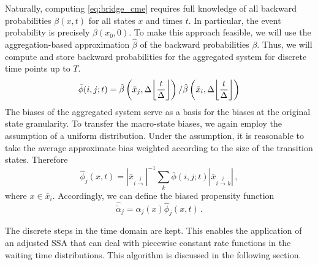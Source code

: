 Naturally, computing \eqref{eq:bridge_cme} requires full knowledge of all backward probabilities $\beta(x, t)$ for all states $x$ and times $t$.
In particular, the event probability is precisely $\beta(x_0, 0)$.
To make this approach feasible, we will use the aggregation-based approximation $\hat{\beta}$ of the backward probabilities $\beta$.
Thus, we will compute and store backward probabilities for the aggregated system for discrete time points up to $T$.
\[
    \bar{\phi}(i, j; t) = \hat{\beta}\left(\bar{x}_j, \Delta\floor*{\frac{t}{\Delta}}\right) / \hat{\beta}\left(\bar{x}_i, \Delta\floor*{\frac{t}{\Delta}}\right)
\]
The biases of the aggregated system serve as a basis for the biases at the original state granularity.
To transfer the macro-state biases, we again employ the assumption of a uniform distribution.
Under the assumption, it is reasonable to take the average approximate bias weighted according to the size of the transition states.
Therefore
\[
    \hat{\phi}_j(x, t)
    =
        {\left|\bar{x}_{i\xrightarrow{j}}\right|}^{-1}
        \sum_k
        \bar\phi(i, j; t)
        \left|\bar{x}_{i\xrightarrow{j}k}\right|\,,
\]
where $x\in\bar{x}_i$.
Accordingly, we can define the biased propensity function
\[
    \hat{\tilde{\alpha}}_j
    =
    \alpha_j(x)\hat{\phi}_j(x, t)\,.
\]

The discrete steps in the time domain are kept.
This enables the application of an adjusted \ac{SSA} that can deal with piecewise constant rate functions in the waiting time distributions.
This algorithm is discussed in the following section.

